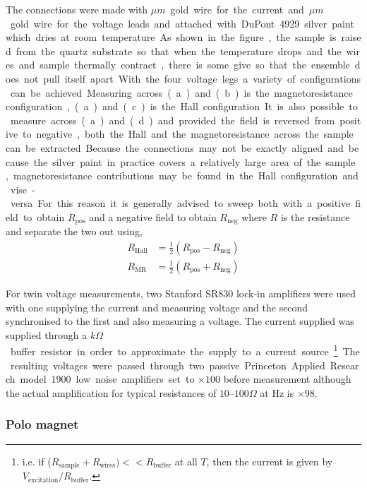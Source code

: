 The connections were made with \unit[20]{$\mu m$} gold wire for the current and \unit[10]{$\mu m$} gold wire for the voltage leads and attached with DuPont 4929 silver paint which dries at room temperature. As shown in the figure, the sample is raised from the quartz substrate so that when the temperature drops and the wires and sample thermally contract, there is some give so that the ensemble does not pull itself apart.

With the four voltage legs a variety of configurations can be achieved. Measuring across (a) and (b) is the magnetoresistance configuration, (a) and (c) is the Hall configuration. It is also possible to measure across (a) and (d) and provided the field is reversed from positive to negative, both the Hall and the magnetoresistance across the sample can be extracted.

Because the connections may not be exactly aligned and because the silver paint in practice covers a relatively large area of the sample, magnetoresistance contributions may be found in the Hall configuration and vise-versa. For this reason it is generally advised to sweep both with a positive field to obtain $R_{\textrm{pos}}$ and a negative field to obtain $R_{\textrm{neg}}$ where $R$ is the resistance and separate the two out using,
\begin{align}
R_{\textrm{Hall}} &= \frac{1}{2}( R_{\textrm{pos}} - R_{\textrm{neg}} ) \\
R_{\textrm{MR}} &= \frac{1}{2}( R_{\textrm{pos}} + R_{\textrm{neg}} )
\end{align}

For twin voltage measurements, two Stanford SR830 lock-in amplifiers were used with one supplying the current and measuring voltage and the second synchronised to the first and also measuring a voltage. The current supplied was supplied through a \unit[1]{$k\Omega$} buffer resistor in order to approximate the supply to a current source\footnote{i.e. if ($R_{\textrm{sample}} + R_{\textrm{wires}}) << R_{\textrm{buffer}} $ at all $T$, then the current is given by $V_{\textrm{excitation}}/R_{\textrm{buffer}}$.}. The resulting voltages were passed through two passive Princeton Applied Research model 1900 low noise amplifiers set to $\times100$ before measurement although the actual amplification for typical resistances of $10$--$100\Omega$ at \unit[33]{Hz} is $\times 98$.

\subsubsection{Polo magnet}


